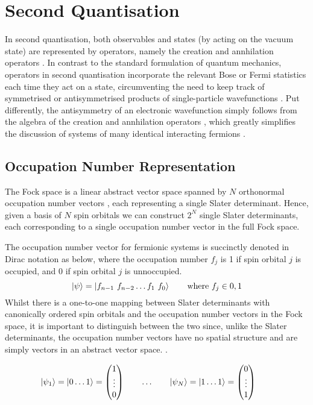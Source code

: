 \section{Second Quantisation}
In second quantisation, both observables and states (by acting on the vacuum state) are represented by operators, namely the creation and annhilation operators \cite{Helgaker2000}. In contrast to the standard formulation of quantum mechanics, operators in second quantisation incorporate the relevant Bose or Fermi statistics each time they act on a state, circumventing the need to keep track of symmetrised or antisymmetrised products of single-particle wavefunctions \cite{Fetter1972}. Put differently, the antisymmetry of an electronic wavefunction simply follows from the algebra of the creation and annhilation operators \cite{Helgaker2000}, which greatly simplifies the discussion of systems of many identical interacting fermions \cite{Fetter1972}.

\subsection{Occupation Number Representation}
The Fock space is a linear abstract vector space spanned by $N$ orthonormal occupation number vectors \cite{Helgaker2000}, each representing a single Slater determinant. Hence, given a basis of $N$ spin orbitals we can construct $2^N$ single Slater determinants, each corresponding to a single occupation number vector in the full Fock space.

The occupation number vector for fermionic systems is succinctly denoted in Dirac notation as below, where the occupation number $f_j$ is 1 if spin orbital $j$ is occupied, and 0 if spin orbital $j$ is unnoccupied.
\begin{equation*}
    \ket\psi = \ket{f_{n-1} \,\, f_{n-2} \dots f_{1} \,\, f_{0}} \qquad \text{where } f_{j} \in {0, 1}
\end{equation*}
Whilst there is a one-to-one mapping between Slater determinants with canonically ordered spin orbitals and the occupation number vectors in the Fock space, it is important to distinguish between the two since, unlike the Slater determinants, the occupation number vectors have no spatial structure and are simply vectors in an abstract vector space. \cite{Helgaker2000}.

\begin{equation*}
    \ket{\psi_1} = \ket{0 \dots 1} =
    \begin{pmatrix} 1 \\ \vdots \\ 0 \end{pmatrix} \qquad
    \dots\qquad
    \ket{\psi_N} = \ket{1 \dots 1} =
    \begin{pmatrix} 0 \\ \vdots \\ 1 \end{pmatrix} \qquad
\end{equation*}

